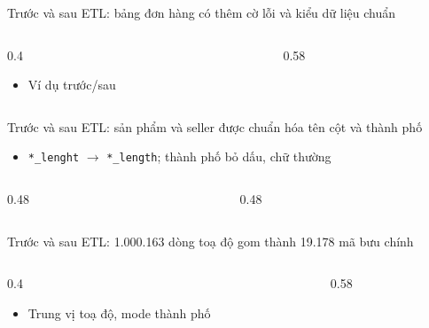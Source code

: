 \begin{frame}{Trước và sau ETL: bảng đơn hàng có thêm cờ lỗi và kiểu dữ liệu chuẩn}
\begin{columns}[T]\begin{column}{0.4\textwidth}
\begin{itemize}
  \item Ví dụ trước/sau
\end{itemize}
\end{column}\begin{column}{0.58\textwidth}
\begin{center}\end{center}
\end{column}\end{columns}

\end{frame}

\begin{frame}{Trước và sau ETL: sản phẩm và seller được chuẩn hóa tên cột và thành phố}
\begin{itemize}
  \item \texttt{*\_\allowbreak{}lenght} $\rightarrow$ \texttt{*\_\allowbreak{}length}; thành phố bỏ dấu, chữ thường
\end{itemize}
\begin{columns}[c]\begin{column}{0.48\textwidth}\end{column}\begin{column}{0.48\textwidth}\end{column}\end{columns}

\end{frame}

\begin{frame}{Trước và sau ETL: 1.000.163 dòng toạ độ gom thành 19.178 mã bưu chính}
\begin{columns}[T]\begin{column}{0.4\textwidth}
\begin{itemize}
  \item Trung vị toạ độ, mode thành phố
\end{itemize}
\end{column}\begin{column}{0.58\textwidth}
\begin{center}\end{center}
\end{column}\end{columns}

\end{frame}

